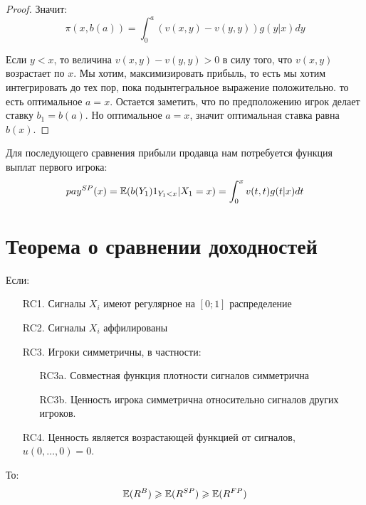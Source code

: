\begin{itemize}
\begin{proof}
Значит:
\begin{equation}
\pi(x,b(a))=\int_{0}^{a}(v(x,y)-v(y,y)) g(y|x)dy
\end{equation}

Если $ y<x $, то величина $ v(x,y)-v(y,y)>0 $ в силу того, что $ v(x,y) $ возрастает по $ x $. Мы хотим, максимизировать прибыль, то есть мы хотим интегрировать до тех пор, пока подынтегральное выражение положительно. то есть оптимальное $ a=x $. Остается заметить, что по предположению игрок делает ставку $ b_{1}=b(a) $. Но оптимальное $ a=x $, значит оптимальная ставка равна $ b(x) $.


\end{proof}


Для последующего сравнения прибыли продавца нам потребуется функция выплат первого игрока:
\begin{equation}
pay^{SP}(x)=\mathbb{E}(b(Y_{1})1_{Y_{1}<x}|X_{1}=x)=\int_{0}^{x}v(t,t)g(t|x)dt
\end{equation}





\end{itemize}



\section{Теорема о сравнении доходностей}


\begin{myth}
Если:

\begin{enumerate}
\item[RC1.] Сигналы $ X_{i} $ имеют регулярное на $ [0;1] $ распределение
\item[RC2.] Сигналы $ X_{i} $ аффилированы
\item[RC3.] Игроки симметричны, в частности:
\begin{enumerate}
\item[RC3a.] Совместная функция плотности сигналов симметрична
\item[RC3b.] Ценность игрока симметрична относительно сигналов других игроков.
\end{enumerate}
\item[RC4.] Ценность является возрастающей функцией от сигналов, $ u(0,\ldots,0)=0 $.

\end{enumerate}

То:
\begin{equation}
\mathbb{E}(R^{B})\geqslant \mathbb{E}(R^{SP})\geqslant \mathbb{E}(R^{FP})
\end{equation}

\end{myth}

